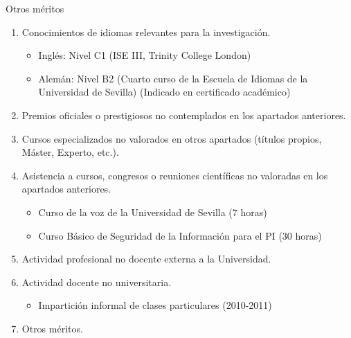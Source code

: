 \documentclass{resume2} %
\begin{document}
\begin{rSection}{Otros méritos}

\begin{enumerate}[label=\alph*.]
\item Conocimientos de idiomas relevantes para la investigaci\'on.

\begin{itemize}
\item Ingl\'es: Nivel C1 (ISE III, Trinity College London)
\item Alem\'an: Nivel B2 (Cuarto curso de la Escuela de Idiomas de la Universidad de Sevilla) (Indicado en certificado académico)
\end{itemize}

\item Premios oficiales o prestigiosos no contemplados en los apartados anteriores.

\item Cursos especializados no valorados en otros apartados (t\'itulos propios, M\'aster, Experto, etc.).

\item Asistencia a cursos, congresos o reuniones cient\'ificas no valoradas en los apartados anteriores.

\begin{itemize}
\item Curso de la voz de la Universidad de Sevilla (7 horas)
\item Curso Básico de Seguridad de la Información para el PI (30 horas)
\end{itemize}

\item Actividad profesional no docente externa a la Universidad.

\item Actividad docente no universitaria.
\begin{itemize}
\item Impartici\'on informal de clases particulares (2010-2011)
\end{itemize}


\item Otros méritos.

\end{enumerate}

\end{rSection}
\end{document}
